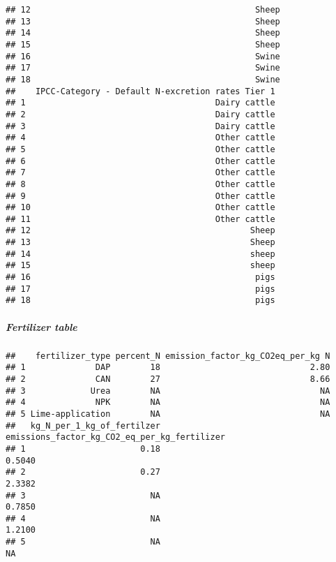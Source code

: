 \documentclass[
]{article}
\newenvironment{Shaded}{\begin{snugshade}}{\end{snugshade}}
\newcommand{\NormalTok}[1]{#1}
\newcommand{\SpecialCharTok}[1]{\textcolor[rgb]{0.00,0.00,0.00}{#1}}
\begin{document}
\begin{verbatim}
## 12                                             Sheep
## 13                                             Sheep
## 14                                             Sheep
## 15                                             Sheep
## 16                                             Swine
## 17                                             Swine
## 18                                             Swine
##    IPCC-Category - Default N-excretion rates Tier 1
## 1                                      Dairy cattle
## 2                                      Dairy cattle
## 3                                      Dairy cattle
## 4                                      Other cattle
## 5                                      Other cattle
## 6                                      Other cattle
## 7                                      Other cattle
## 8                                      Other cattle
## 9                                      Other cattle
## 10                                     Other cattle
## 11                                     Other cattle
## 12                                            Sheep
## 13                                            Sheep
## 14                                            sheep
## 15                                            sheep
## 16                                             pigs
## 17                                             pigs
## 18                                             pigs
\end{verbatim}

\hypertarget{fertilizer-table}{%
\subparagraph{Fertilizer table}\label{fertilizer-table}}

\begin{Shaded}
\end{Shaded}

\begin{verbatim}
##    fertilizer_type percent_N emission_factor_kg_CO2eq_per_kg N
## 1              DAP        18                              2.80
## 2              CAN        27                              8.66
## 3             Urea        NA                                NA
## 4              NPK        NA                                NA
## 5 Lime-application        NA                                NA
##   kg_N_per_1_kg_of_fertilzer emissions_factor_kg_CO2_eq_per_kg_fertilizer
## 1                       0.18                                       0.5040
## 2                       0.27                                       2.3382
## 3                         NA                                       0.7850
## 4                         NA                                       1.2100
## 5                         NA                                           NA
\end{verbatim}
\end{document}
